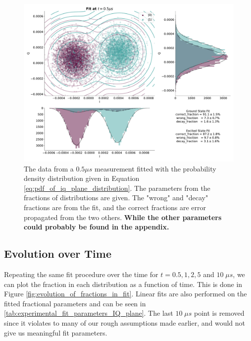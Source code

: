 \begin{figure}
    \centering
    \includegraphics{Figs/Results/IQ_plane_initial/fit_0_5.pdf}
    \caption{The data from a $0.5 \mu s$ measurement fitted with the probability density distribution given in Equation \ref{eq:pdf_of_iq_plane_distribution}. The parameters from the fractions of distributions are given. The "wrong" and "decay" fractions are from the fit, and the correct fractions are error propagated from the two others. \textbf{While the other parameters could probably be found in the appendix.}}
    \label{fig:fit_0_5_IQ_plane}
\end{figure}



\subsection{Evolution over Time}
Repeating the same fit procedure over the time for $t = 0.5, 1, 2, 5$ and $10 \; \mu s$, we can plot the fraction in each distribution as a function of time. This is done in Figure \ref{fig:evolution_of_fractions_in_fit}. Linear fits are also performed on the fitted fractional parameters and can be seen in \ref{tab:experimental_fit_parameters_IQ_plane}. The last $10 \; \mu s$ point is removed since it violates to many of our rough assumptions made earlier, and would not give us meaningful fit parameters.

